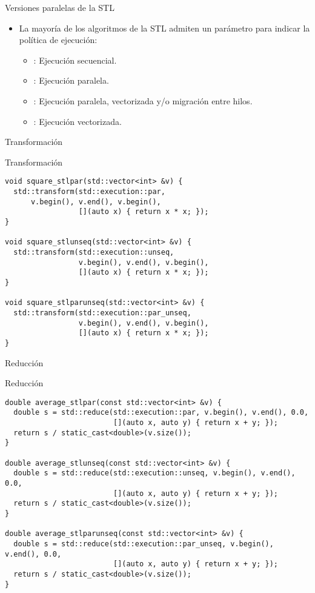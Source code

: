 \begin{frame}[t,fragile]{Versiones paralelas de la STL}
\begin{itemize}
  \item La mayoría de los algoritmos de la STL admiten un parámetro para indicar
        la política de ejecución:
    \begin{itemize}
      \item {}:
            Ejecución secuencial.
      \item {}:
            Ejecución paralela.
      \item {}:
            Ejecución paralela, vectorizada y/o migración entre hilos.
      \item {}:
            Ejecución vectorizada.
    \end{itemize}

\end{itemize}
\end{frame}

\begin{frame}[t,fragile]{Transformación}
\begin{block}{Transformación}
\begin{lstlisting}
void square_stlpar(std::vector<int> &v) {
  std::transform(std::execution::par,
      v.begin(), v.end(), v.begin(),
                 [](auto x) { return x * x; });
}

void square_stlunseq(std::vector<int> &v) {
  std::transform(std::execution::unseq,
                 v.begin(), v.end(), v.begin(),
                 [](auto x) { return x * x; });
}

void square_stlparunseq(std::vector<int> &v) {
  std::transform(std::execution::par_unseq,
                 v.begin(), v.end(), v.begin(),
                 [](auto x) { return x * x; });
}
\end{lstlisting}
\end{block}
\end{frame}

\begin{frame}[t,fragile]{Reducción}
\begin{block}{Reducción}
\begin{lstlisting}
double average_stlpar(const std::vector<int> &v) {
  double s = std::reduce(std::execution::par, v.begin(), v.end(), 0.0,
                         [](auto x, auto y) { return x + y; });
  return s / static_cast<double>(v.size());
}

double average_stlunseq(const std::vector<int> &v) {
  double s = std::reduce(std::execution::unseq, v.begin(), v.end(), 0.0,
                         [](auto x, auto y) { return x + y; });
  return s / static_cast<double>(v.size());
}

double average_stlparunseq(const std::vector<int> &v) {
  double s = std::reduce(std::execution::par_unseq, v.begin(), v.end(), 0.0,
                         [](auto x, auto y) { return x + y; });
  return s / static_cast<double>(v.size());
}
\end{lstlisting}
\end{block}
\end{frame}

